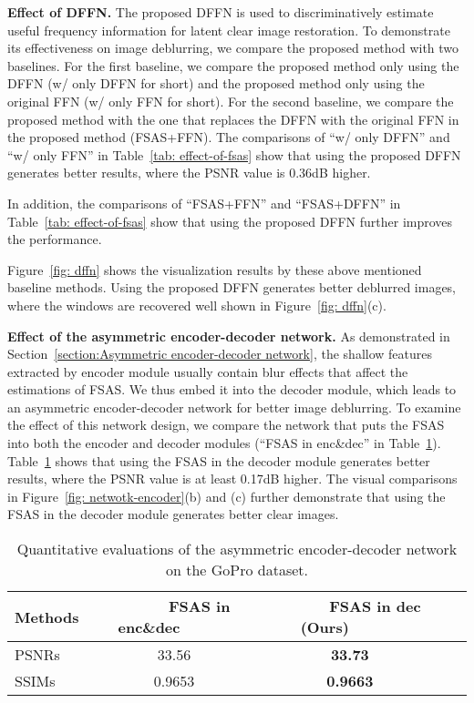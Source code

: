 \documentclass[10pt,twocolumn,letterpaper]{article}
\begin{document}
\vspace{-2mm}
{\flushleft \textbf{Effect of DFFN.}}
The proposed DFFN is used to discriminatively estimate useful frequency information for latent clear image restoration.
To demonstrate its effectiveness on image deblurring, we compare the proposed method with two baselines. For the first baseline, we compare the proposed method only using the DFFN  (w/ only DFFN for short) and the proposed method only using the original FFN (w/ only FFN for short). For the second baseline, we compare the proposed method with the one that replaces the DFFN with the original FFN in the proposed method (FSAS+FFN).
The comparisons of ``w/ only DFFN'' and ``w/ only FFN'' in Table~\ref{tab: effect-of-fsas} show that using the proposed DFFN generates better results, where the PSNR value is 0.36dB higher.


In addition, the comparisons of ``FSAS+FFN'' and ``FSAS+DFFN'' in Table~\ref{tab: effect-of-fsas} show that using the proposed DFFN further improves the performance.

Figure~\ref{fig: dffn} shows the visualization results by these above mentioned baseline methods. Using the proposed DFFN generates better deblurred images, where the windows are recovered well shown in Figure~\ref{fig: dffn}(c).


\vspace{-2mm}
{\flushleft \textbf{Effect of the asymmetric encoder-decoder network.}}
As demonstrated in Section~\ref{section:Asymmetric encoder-decoder network}, the shallow features extracted by encoder module usually contain blur effects that affect the estimations of FSAS.
We thus embed it into the decoder module, which leads to an asymmetric encoder-decoder network for better image deblurring.
To examine the effect of this network design, we compare the network that puts the FSAS into both the encoder and decoder modules (``FSAS in enc\&dec'' in Table~\ref{tab: fsas-location}).
Table~\ref{tab: fsas-location} shows that using the FSAS in the decoder module generates better results, where the PSNR value is at least 0.17dB higher.
The visual comparisons in Figure~\ref{fig: netwotk-encoder}(b) and (c) further demonstrate that using the FSAS in the decoder module generates better clear images.

\begin{table}[!t]
  \caption{Quantitative evaluations of the asymmetric encoder-decoder network on the GoPro dataset.
  }
   \vspace{-3mm}
   \label{tab: fsas-location}
\footnotesize
\centering
\begin{tabular}{lcccc}
    \toprule
Methods       &~~~~~~FSAS in enc\&dec~~~~~~  &~~~~~~FSAS in dec (Ours)~~~~~~ \\\hline
 PSNRs            &33.56          & \bf{33.73}  \\
 SSIMs            &0.9653        & \bf{0.9663} \\
 \bottomrule
  \end{tabular}
\vspace{-2mm}
\end{table}
\end{document}
